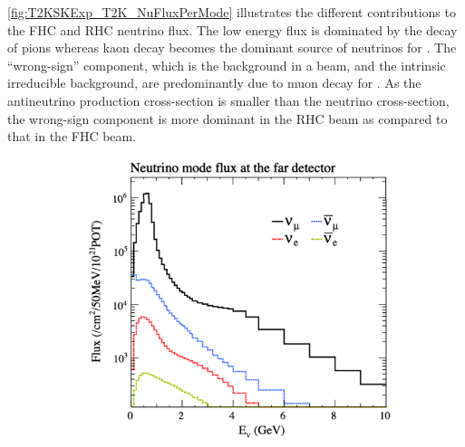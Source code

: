 \autoref{fig:T2KSKExp_T2K_NuFluxPerMode} illustrates the different contributions to the FHC and RHC neutrino flux. The low energy flux is dominated by the decay of pions whereas kaon decay becomes the dominant source of neutrinos for . The ``wrong-sign'' component, which is the \quickmath{\bar{\nu}_\mu} background in a \quickmath{\nu_\mu} beam, and the intrinsic irreducible  background, are predominantly due to muon decay for . As the antineutrino production cross-section is smaller than the neutrino cross-section, the wrong-sign component is more dominant in the RHC beam as compared to that in the FHC beam.

\begin{figure}[h]
  \begin{subfigure}[t]{0.45\textwidth}
    \includegraphics[width=\textwidth, trim={0mm 0mm 0mm 0mm}, clip,page=1]{Figures/Detectors/T2KFluxInNuMode.pdf}
  \end{subfigure}%
  \begin{subfigure}[t]{0.45\textwidth}

\end{subfigure}
\end{figure}
